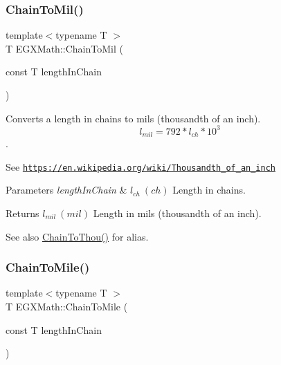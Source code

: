 \subsubsection{\texorpdfstring{Chain\+To\+Mil()}{ChainToMil()}}
{\footnotesize\ttfamily template$<$typename T $>$ \\
T E\+G\+X\+Math\+::\+Chain\+To\+Mil (\begin{DoxyParamCaption}\item[{const T}]{length\+In\+Chain }\end{DoxyParamCaption})}



Converts a length in chains to mils (thousandth of an inch). \[ l_{mil}=792 * l_{ch} * 10^{3} \]. 

See \href{https://en.wikipedia.org/wiki/Thousandth_of_an_inch}{\tt https\+://en.\+wikipedia.\+org/wiki/\+Thousandth\+\_\+of\+\_\+an\+\_\+inch} 
\begin{DoxyParams}{Parameters}
{\em length\+In\+Chain} & $ l_{ch}\ (ch)$ Length in chains. \\
\hline
\end{DoxyParams}
\begin{DoxyReturn}{Returns}
$ l_{mil}\ (mil)$ Length in mils (thousandth of an inch). 
\end{DoxyReturn}
\begin{DoxySeeAlso}{See also}
\mbox{\hyperlink{group___e_g_x_math-_conversions-_length_conversions-_imperial-_chain-_imperial_ga64cd46f80e3af5d7ca664456080ef6a3}{Chain\+To\+Thou()}} for alias. 
\end{DoxySeeAlso}
\mbox{\label{group___e_g_x_math-_conversions-_length_conversions-_imperial-_chain-_imperial_ga260b1e534400c8ee9ec5001641b2a451}} 
\subsubsection{\texorpdfstring{Chain\+To\+Mile()}{ChainToMile()}}
{\footnotesize\ttfamily template$<$typename T $>$ \\
T E\+G\+X\+Math\+::\+Chain\+To\+Mile (\begin{DoxyParamCaption}\item[{const T}]{length\+In\+Chain }\end{DoxyParamCaption})}



